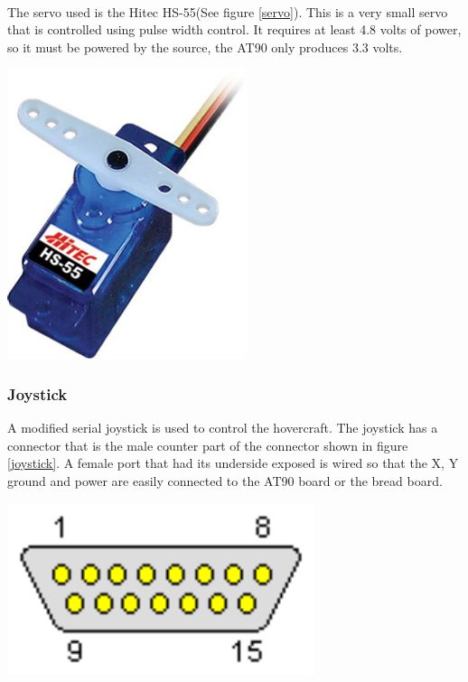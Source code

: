 \\

The servo used is the Hitec HS-55(See figure \ref{servo}). This is a very small servo that is controlled using pulse width control. It requires at least 4.8 volts of power, so it must be powered by the source, the AT90 only produces 3.3 volts.

\begin{minipage}{7in}
  \centering
    \includegraphics[width=70mm]{imageSources/servo.png}
  
  \label{servo}
\end{minipage}
\vspace{0.1in}

\subsubsection{Joystick}
 A modified serial joystick is used to control the hovercraft. The joystick has a connector that is the male counter part of the connector shown in figure \ref{joystick}. A female port that had its underside exposed is  wired so that the X, Y ground and power are easily connected to the AT90 board or the bread board. 

\begin{minipage}{7in}
  \centering
    \includegraphics[width=90mm]{imageSources/joystick.png}
  
  \label{joystick}
\end{minipage}
\vspace{0.1in}


